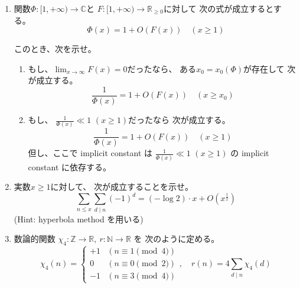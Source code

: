\documentclass[12pt,b5paper]{ltjsarticle}
\begin{document}
\begin{enumerate}
 \item
      関数$\Phi:[1,+\infty)\to\mathbb{C}$と
      $F:[1,+\infty)\to\mathbb{R}_{\geq 0}$に対して
      次の式が成立するとする。
      \begin{equation}
       \Phi(x) = 1+ O(F(x)) \quad (x\geq 1)
      \end{equation}
      
      このとき、次を示せ。
      \begin{enumerate}
       \item
            もし、$\lim_{x\to\infty}F(x)=0$だったなら、
            ある$x_{0}=x_{0}(\Phi)$が存在して
            次が成立する。
            \begin{equation}
             \frac{1}{\Phi(x)}= 1+ O(F(x)) \quad (x\geq x_{0})
            \end{equation}


       \item
            もし、
            $\frac{1}{\Phi(x)} \ll 1$ $(x\geq 1)$だったなら
            次が成立する。
            \begin{equation}
             \frac{1}{\Phi(x)}= 1+ O(F(x)) \quad (x\geq 1)
            \end{equation}
            但し、ここで implicit constant は
            $\frac{1}{\Phi(x)} \ll 1$ $(x\geq 1)$
            の implicit constant に依存する。


      \end{enumerate}


 \item
      実数$x\geq 1$に対して、
      次が成立することを示せ。
      \begin{equation}
       \sum_{n\leq x} \sum_{d \mid n}(-1)^{d}
        = (-\log{2})\cdot x + O(x^{\frac{1}{2}})
      \end{equation}
      (Hint: hyperbola method を用いる)



 \item
      数論的関数
      $\chi_{4} : \mathbb{Z}\to\mathbb{R}
      ,\ 
      r:\mathbb{N}\to\mathbb{R}$
      を
      次のように定める。
      \begin{equation}
       \chi_{4}(n) =
        \begin{cases}
         +1 & ( n\equiv 1 \pmod{4})\\
         0 & ( n\equiv 0 \pmod{2})\\
         -1 & ( n\equiv 3 \pmod{4})
        \end{cases}
        ,\quad
        r(n)=4\sum_{d\mid n} \chi_{4}(d)
      \end{equation}


\end{enumerate}
\end{document}
